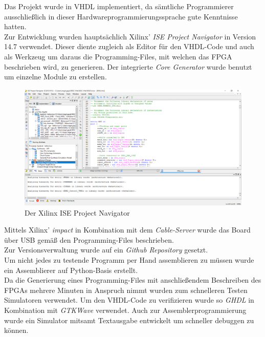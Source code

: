 Das Projekt wurde in VHDL implementiert, da s\"amtliche Programmierer ausschlie{\ss}lich in dieser Hardwareprogrammierungssprache gute Kenntnisse hatten.\\
Zur Entwicklung wurden haupts\"achlich Xilinx' \textit{ISE Project Navigator} in Version 14.7 verwendet. Dieser diente zugleich als Editor f\"ur den VHDL-Code und auch als Werkzeug um daraus die Programming-Files, mit welchen das FPGA beschrieben wird, zu generieren. Der integrierte \textit{Core Generator} wurde benutzt um einzelne Module zu erstellen.\\
\begin{figure}[H]
	\centering
		\includegraphics[width=1.0\textwidth]{ISE.png}
	\caption{Der Xilinx ISE Project Navigator}
	\label{fig:tool}
\end{figure}
Mittels Xilinx' \textit{impact} in Kombination mit dem \textit{Cable-Server} wurde das Board \"uber USB gem\"a{\ss} den Programming-Files beschrieben.\\
Zur Versionsverwaltung wurde auf ein \textit{Github Repository} gesetzt.\\ 
Um nicht jedes zu testende Programm per Hand assemblieren zu m\"ussen wurde ein Assemblierer auf Python-Basis erstellt.\\
Da die Generierung eines Programming-Files mit anschlie{\ss}endem Beschreiben des FPGAs mehrere Minuten in Anspruch nimmt wurden zum schnelleren Testen Simulatoren verwendet. Um den VHDL-Code zu verifizieren wurde so \textit{GHDL} in Kombination mit \textit{GTKWave} verwendet. Auch zur Assemblerprogrammierung wurde ein Simulator mitsamt Textausgabe entwickelt um schneller debuggen zu k\"onnen.
